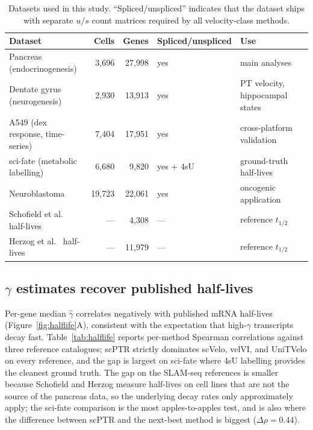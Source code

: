 \documentclass{article}
\begin{document}
\begin{table}[h]
\caption{Datasets used in this study. ``Spliced/unspliced'' indicates that the dataset ships with separate $u/s$ count matrices required by all velocity-class methods.}
\label{tab:datasets}
\centering
\begin{tabular}{lrrlll}
\toprule
Dataset & Cells & Genes & Spliced/unspliced & Use \\
\midrule
Pancreas (endocrinogenesis) & 3,696 & 27,998 & yes & main analyses \\
Dentate gyrus (neurogenesis) & 2,930 & 13,913 & yes & PT velocity, hippocampal states \\
A549 (dex response, time-series) & 7,404 & 17,951 & yes & cross-platform validation \\
sci-fate (metabolic labelling) & 6,680 & 9,820 & yes + 4sU & ground-truth half-lives \\
Neuroblastoma \cite{dong2020} & 19,723 & 22,061 & yes & oncogenic application \\
Schofield et al.\ \cite{schofield2018} half-lives & --- & 4,308 & --- & reference $t_{1/2}$ \\
Herzog et al.\ \cite{herzog2017} half-lives & --- & 11,979 & --- & reference $t_{1/2}$ \\
\bottomrule
\end{tabular}
\end{table}

\subsection{\texorpdfstring{$\gamma$}{gamma} estimates recover published half-lives}
\label{sec:halflife}

Per-gene median $\widehat{\gamma}$ correlates negatively with published mRNA half-lives (Figure~\ref{fig:halflife}A), consistent with the expectation that high-$\gamma$ transcripts decay fast. Table~\ref{tab:halflife} reports per-method Spearman correlations against three reference catalogues; scPTR strictly dominates scVelo, velVI, and UniTVelo on every reference, and the gap is largest on sci-fate where 4sU labelling provides the cleanest ground truth. The gap on the SLAM-seq references is smaller because Schofield and Herzog measure half-lives on cell lines that are not the source of the pancreas data, so the underlying decay rates only approximately apply; the sci-fate comparison is the most apples-to-apples test, and is also where the difference between scPTR and the next-best method is biggest ($\Delta\rho{=}0.44$).
\end{document}
